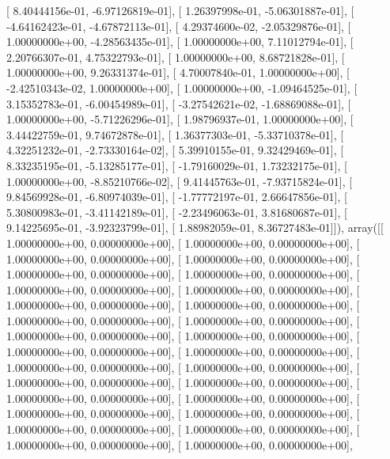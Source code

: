 \documentclass{article}
\begin{document}
       [  8.40444156e-01,  -6.97126819e-01],
       [  1.26397998e-01,  -5.06301887e-01],
       [ -4.64162423e-01,  -4.67872113e-01],
       [  4.29374600e-02,  -2.05329876e-01],
       [  1.00000000e+00,  -4.28563435e-01],
       [  1.00000000e+00,   7.11012794e-01],
       [  2.20766307e-01,   4.75322793e-01],
       [  1.00000000e+00,   8.68721828e-01],
       [  1.00000000e+00,   9.26331374e-01],
       [  4.70007840e-01,   1.00000000e+00],
       [ -2.42510343e-02,   1.00000000e+00],
       [  1.00000000e+00,  -1.09464525e-01],
       [  3.15352783e-01,  -6.00454989e-01],
       [ -3.27542621e-02,  -1.68869088e-01],
       [  1.00000000e+00,  -5.71226296e-01],
       [  1.98796937e-01,   1.00000000e+00],
       [  3.44422759e-01,   9.74672878e-01],
       [  1.36377303e-01,  -5.33710378e-01],
       [  4.32251232e-01,  -2.73330164e-02],
       [  5.39910155e-01,   9.32429469e-01],
       [  8.33235195e-01,  -5.13285177e-01],
       [ -1.79160029e-01,   1.73232175e-01],
       [  1.00000000e+00,  -8.85210766e-02],
       [  9.41445763e-01,  -7.93715824e-01],
       [  9.84569928e-01,  -6.80974039e-01],
       [ -1.77772197e-01,   2.66647856e-01],
       [  5.30800983e-01,  -3.41142189e-01],
       [ -2.23496063e-01,   3.81680687e-01],
       [  9.14225695e-01,  -3.92323799e-01],
       [  1.88982059e-01,   8.36727483e-01]]), array([[  1.00000000e+00,   0.00000000e+00],
       [  1.00000000e+00,   0.00000000e+00],
       [  1.00000000e+00,   0.00000000e+00],
       [  1.00000000e+00,   0.00000000e+00],
       [  1.00000000e+00,   0.00000000e+00],
       [  1.00000000e+00,   0.00000000e+00],
       [  1.00000000e+00,   0.00000000e+00],
       [  1.00000000e+00,   0.00000000e+00],
       [  1.00000000e+00,   0.00000000e+00],
       [  1.00000000e+00,   0.00000000e+00],
       [  1.00000000e+00,   0.00000000e+00],
       [  1.00000000e+00,   0.00000000e+00],
       [  1.00000000e+00,   0.00000000e+00],
       [  1.00000000e+00,   0.00000000e+00],
       [  1.00000000e+00,   0.00000000e+00],
       [  1.00000000e+00,   0.00000000e+00],
       [  1.00000000e+00,   0.00000000e+00],
       [  1.00000000e+00,   0.00000000e+00],
       [  1.00000000e+00,   0.00000000e+00],
       [  1.00000000e+00,   0.00000000e+00],
       [  1.00000000e+00,   0.00000000e+00],
       [  1.00000000e+00,   0.00000000e+00],
       [  1.00000000e+00,   0.00000000e+00],
       [  1.00000000e+00,   0.00000000e+00],
       [  1.00000000e+00,   0.00000000e+00],
       [  1.00000000e+00,   0.00000000e+00],
       [  1.00000000e+00,   0.00000000e+00],
       [  1.00000000e+00,   0.00000000e+00],
\end{document}
